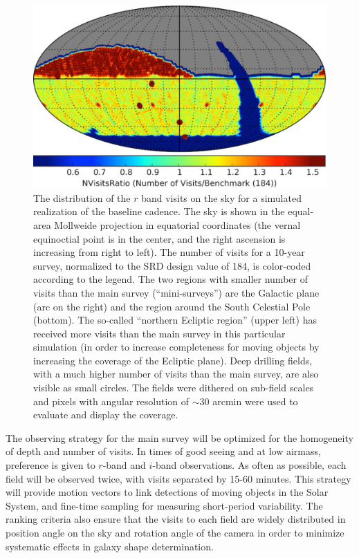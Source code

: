 \documentclass{emulateapj}
\begin{document}
\begin{figure}
\includegraphics[width=1.0\hsize,clip]{rBandWhite.png}
\vskip -0.01in
\caption{The distribution of the $r$ band visits on the sky for a simulated 
realization of the baseline cadence. The sky is shown in the equal-area Mollweide 
projection in equatorial coordinates (the vernal equinoctial point is in the center, and 
the right ascension is increasing from right to left). The number of visits for 
a 10-year survey, normalized to the SRD design value of 184, is color-coded according
to the legend. The two regions with smaller number of visits than the main survey 
(``mini-surveys'') are the Galactic plane (arc on the right) and the region around the 
South Celestial Pole (bottom). The so-called ``northern Ecliptic region'' (upper left)
has received more visits than the main survey in this particular simulation (in
order to increase completeness for moving objects by increasing the coverage of
the Ecliptic plane). Deep drilling fields, with a much higher number of visits than
the main survey, are also visible as small circles. The fields were dithered on 
sub-field scales and pixels with angular resolution of $\sim$30 arcmin were used 
to evaluate and display the coverage.} 
\label{Fig:rbandSky}
\end{figure}

The observing strategy for the main survey will be optimized for the homogeneity
of depth and number of visits. In times of good seeing and at low airmass, preference 
is given to $r$-band and $i$-band observations. As often as possible, each field will be 
observed twice, with visits separated by 15-60 minutes. This strategy will provide motion 
vectors to link detections of moving objects in the Solar System, and fine-time sampling 
for measuring short-period variability. The ranking criteria also ensure that the 
visits to each field are widely distributed in position angle on the sky and 
rotation angle of the camera in order to minimize systematic effects in galaxy shape 
determination.
\end{document}
